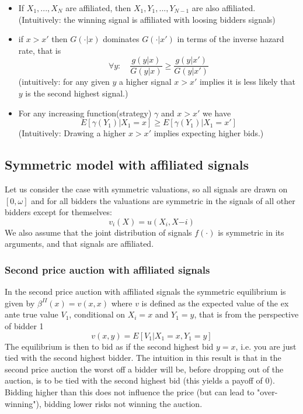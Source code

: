 \begin{itemize}
  \item If $X_1, ..., X_N$ are affiliated, then $X_1, Y_1, ..., Y_{N-1}$ are also affiliated. (Intuitively: the winning signal is affiliated with loosing bidders signals)
  \item if $x>x'$ then $G(\cdot|x)$ dominates $G(\cdot|x')$ in terms of the inverse hazard rate, that is
  \begin{equation}
    \forall y: \quad \frac{g(y|x)}{G(y|x)} \geq \frac{g(y|x')}{G(y|x')}
  \end{equation}
  (intuitively: for any given $y$ a higher signal $x>x'$ implies it is less likely that $y$ is the second highest signal.)
  \item For any increasing function(strategy) $\gamma$ and $x>x'$ we have
  \begin{equation}
    E[\gamma(Y_1)|X_1 = x] \geq E[\gamma(Y_1)|X_1 = x']
  \end{equation}
  (Intuitively: Drawing a higher $x>x'$ implies expecting higher bids.)
\end{itemize}

\subsection{Symmetric model with affiliated signals}
Let us consider the case with symmetric valuations, so all signals are drawn on $[0,\omega]$ and for all bidders the valuations are symmetric in the signals of all other bidders except for themselves:
\begin{equation}
  v_i(X) = u(X_i, X{-i})
\end{equation}
We also assume that the joint distribution of signals $f(\cdot)$ is symmetric in its arguments, and that signals are affiliated.

\subsubsection{Second price auction with affiliated signals}
In the second price auction with affiliated signals the symmetric equilibrium is given by $\beta^{II}(x)=v(x,x)$ where $v$ is defined as the expected value of the ex ante true value $V_1$, conditional on $X_i = x$ and $Y_1 = y$, that is from the perspective of bidder 1
\begin{equation}
  v(x,y) = E[V_1 | X_1=x, Y_1 = y]
\end{equation}
The equilibrium is then to bid as if the second highest bid $y=x$, i.e. you are just tied with the second highest bidder. The intuition in this result is that in the second price auction the worst off a bidder will be, before dropping out of the auction, is to be tied with the second highest bid (this yields a payoff of 0). Bidding higher than this does not influence the price (but can lead to "over-winning"), bidding lower risks not winning the auction. 

